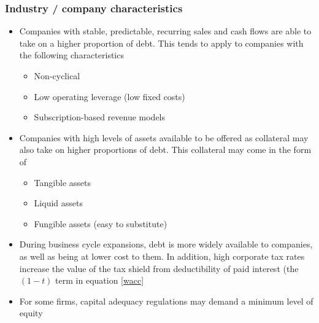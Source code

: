 \documentclass[../notes_compiled.tex]{subfiles}
\begin{document}
\subsubsection{Industry / company characteristics}
\begin{itemize}
\item Companies with stable, predictable, recurring sales and cash flows are able to take on a higher proportion of debt. This tends to apply to companies with the following characteristics
\begin{itemize}
\item Non-cyclical
\item Low operating leverage (low fixed costs)
\item Subscription-based revenue models
\end{itemize}
\item Companies with high levels of assets available to be offered as collateral may also take on higher proportions of debt. This collateral may come in the form of
\begin{itemize}
\item Tangible assets
\item Liquid assets
\item Fungible assets (easy to substitute)
\end{itemize}

\item During business cycle expansions, debt is more widely available to companies, as well as being at lower cost to them. In addition, high corporate tax rates increase the value of the tax shield from deductibility of paid interest (the $(1-t)$ term in equation \ref{wacc}
\item For some firms, capital adequacy regulations may demand a minimum level of equity
\end{itemize}
\end{document}
